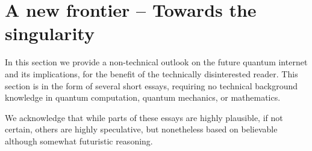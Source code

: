 %
%

\section{A new frontier -- Towards the singularity} \label{sec:outlook}  

In this section we provide a non-technical outlook on the future quantum internet and its implications, for the benefit of the technically disinterested reader. This section is in the form of several short essays, requiring no technical background knowledge in quantum computation, quantum mechanics, or mathematics.

We acknowledge that while parts of these essays are highly plausible, if not certain, others are highly speculative, but nonetheless based on believable although somewhat futuristic reasoning. 

%
%



%
%



%
%



%
%



%
%



%
%



%
%



%
%


